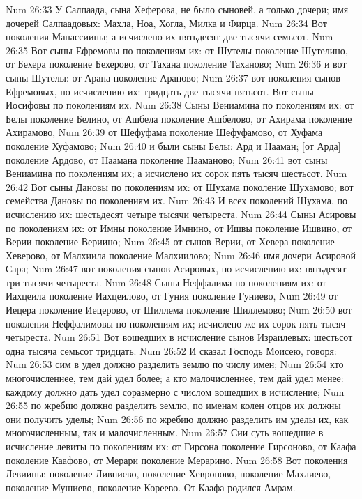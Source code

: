 \vs Num 26:33 У Салпаада, сына Хеферова, не было сыновей, а только дочери; имя дочерей Салпаадовых: Махла, Ноа, Хогла, Милка и Фирца.
\vs Num 26:34 Вот поколения Манассиины; а исчислено их пятьдесят две тысячи семьсот.
\vs Num 26:35 Вот сыны Ефремовы по поколениям их: от Шутелы поколение Шутелино, от Бехера поколение Бехерово, от Тахана поколение Таханово;
\vs Num 26:36 и вот сыны Шутелы: от Арана поколение Араново;
\vs Num 26:37 вот поколения сынов Ефремовых, по исчислению их: тридцать две тысячи пятьсот. Вот сыны Иосифовы по поколениям их.
\vs Num 26:38 Сыны Вениамина по поколениям их: от Белы поколение Белино, от Ашбела поколение Ашбелово, от Ахирама поколение Ахирамово,
\vs Num 26:39 от Шефуфама поколение Шефуфамово, от Хуфама поколение Хуфамово;
\vs Num 26:40 и были сыны Белы: Ард и Нааман; [от Арда] поколение Ардово, от Наамана поколение Нааманово;
\vs Num 26:41 вот сыны Вениамина по поколениям их; а исчислено их сорок пять тысяч шестьсот.
\vs Num 26:42 Вот сыны Дановы по поколениям их: от Шухама поколение Шухамово; вот семейства Дановы по поколениям их.
\vs Num 26:43 И всех поколений Шухама, по исчислению их: шестьдесят четыре тысячи четыреста.
\vs Num 26:44 Сыны Асировы по поколениям их: от Имны поколение Имнино, от Ишвы поколение Ишвино, от Верии поколение Вериино;
\vs Num 26:45 от сынов Верии, от Хевера поколение Хеверово, от Малхиила поколение Малхиилово;
\vs Num 26:46 имя дочери Асировой Сара;
\vs Num 26:47 вот поколения сынов Асировых, по исчислению их: пятьдесят три тысячи четыреста.
\vs Num 26:48 Сыны Неффалима по поколениям их: от Иахцеила поколение Иахцеилово, от Гуния поколение Гуниево,
\vs Num 26:49 от Иецера поколение Иецерово, от Шиллема поколение Шиллемово;
\vs Num 26:50 вот поколения Неффалимовы по поколениям их; исчислено же их сорок пять тысяч четыреста.
\vs Num 26:51 Вот  вошедших в исчисление сынов Израилевых: шестьсот одна тысяча семьсот тридцать.
\rsbpar\vs Num 26:52 И сказал Господь Моисею, говоря:
\vs Num 26:53 сим в удел должно разделить землю по числу имен;
\vs Num 26:54 кто многочисленнее, тем дай удел более; а кто малочисленнее, тем дай удел менее: каждому должно дать удел соразмерно с числом вошедших в исчисление;
\vs Num 26:55 по жребию должно разделить землю, по именам колен отцов их должны они получить уделы;
\vs Num 26:56 по жребию должно разделить им уделы их, как многочисленным, так и малочисленным.
\rsbpar\vs Num 26:57 Сии суть вошедшие в исчисление левиты по поколениям их: от Гирсона поколение Гирсоново, от Каафа поколение Каафово, от Мерари поколение Мерарино.
\vs Num 26:58 Вот поколения Левиины: поколение Ливниево, поколение Хевроново, поколение Махлиево, поколение Мушиево, поколение Кореево. От Каафа родился Амрам.
